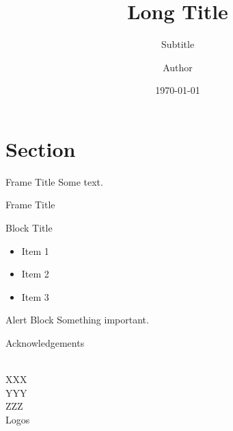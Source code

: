 \documentclass{myBeamer}
\title[Short Title]{Long Title}
\subtitle{Subtitle}
\author[Short Author]{Author}
\date{\today}
\institute{Institut\\
\bigskip
\texttt{[image: figures/logos/openmole.png]}}
\begin{document}
\begin{frame}[plain]
	\titlepage
\end{frame}
\addtocounter{framenumber}{-1}



\section{Section}

\begin{frame}{Frame Title}
	Some text.
\end{frame}


\begin{frame}{Frame Title}
	\begin{block}{Block Title}
	\begin{itemize}
		\item Item 1
		\item Item 2
		\item Item 3
	\end{itemize}
	\end{block}
	
	\begin{alertblock}{Alert Block}
		Something important.
	\end{alertblock}
\end{frame}


\backupbegin

\appendix
\begin{frame}[plain]{Acknowledgements}
	\begin{center}
	\\
	
	\medskip
	XXX\\
	\medskip
	YYY\\
	\medskip
	ZZZ\\
	
	\bigskip
	Logos
	\end{center}
	
\end{frame}

%

\backupend
\end{document}
